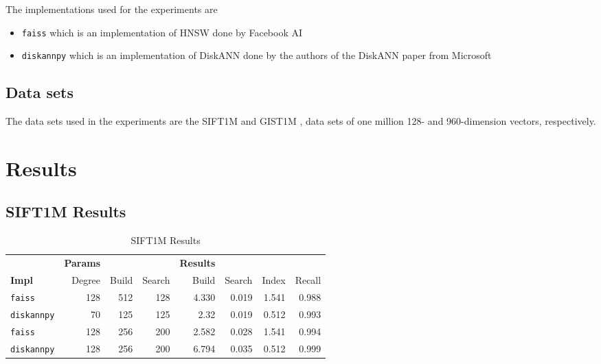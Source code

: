 The implementations used for the experiments are
\begin{itemize}
    \item \texttt{faiss} \cite{faiss-github} which is an implementation of HNSW done by Facebook AI
    \item \texttt{diskannpy} \cite{diskann-github} which is an implementation of DiskANN done by the authors of the DiskANN paper from Microsoft
\end{itemize}

\subsection{Data sets}

The data sets used in the experiments are the SIFT1M and GIST1M \cite{sift}, data sets of one million 128- and 960-dimension vectors, respectively.

\section{Results}

\subsection{SIFT1M Results}

\begin{table}[ht]
    \centering
    \caption{SIFT1M Results}
    \label{tbl:sift1m-results}
    \begin{tabular}{l|rrr|rrrr}
        \toprule
        & \textbf{Params} & & & \textbf{Results} & & \\
        \textbf{Impl} & Degree & Build & Search & Build & Search & Index & Recall \\
        \midrule
        \texttt{faiss} & 128 & 512 & 128 & 4.330 & 0.019 & 1.541 & 0.988 \\
        \texttt{diskannpy} & 70 & 125 & 125 & 2.32 & 0.019 & 0.512 & 0.993 \\
        \midrule
        \texttt{faiss} & 128 & 256 & 200 & 2.582 & 0.028 & 1.541 & 0.994  \\
        \texttt{diskannpy} & 128 & 256 & 200 & 6.794 & 0.035 & 0.512 & 0.999 \\
        \bottomrule
    \end{tabular}
\end{table}


